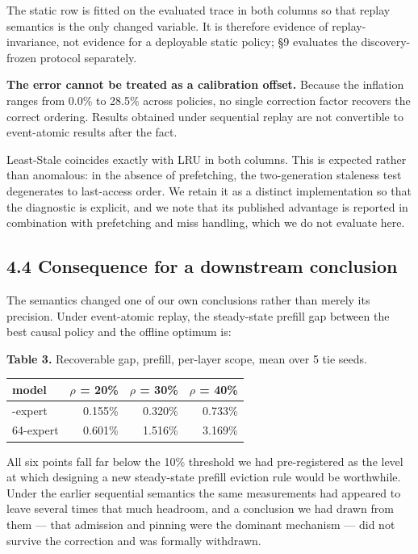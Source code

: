 \documentclass[
  10pt,
  letterpaper,
  10pt]{article}
\newcounter{none} %
\begin{document}
The static row is fitted on the evaluated trace in both columns so that
replay semantics is the only changed variable. It is therefore evidence
of replay-invariance, not evidence for a deployable static policy; §9
evaluates the discovery-frozen protocol separately.

\textbf{The error cannot be treated as a calibration offset.} Because
the inflation ranges from 0.0\% to 28.5\% across policies, no single
correction factor recovers the correct ordering. Results obtained under
sequential replay are not convertible to event-atomic results after the
fact.

Least-Stale coincides exactly with LRU in both columns. This is expected
rather than anomalous: in the absence of prefetching, the two-generation
staleness test degenerates to last-access order. We retain it as a
distinct implementation so that the diagnostic is explicit, and we note
that its published advantage is reported in combination with prefetching
and miss handling, which we do not evaluate here.

\subsection{4.4 Consequence for a downstream
conclusion}\label{consequence-for-a-downstream-conclusion}

The semantics changed one of our own conclusions rather than merely its
precision. Under event-atomic replay, the steady-state prefill gap
between the best causal policy and the offline optimum is:

\textbf{Table 3.} Recoverable gap, prefill, per-layer scope, mean over 5
tie seeds.

{\def\LTcaptype{none} %
\begin{longtable}[]{@{}lrrr@{}}
\toprule\noalign{}
model & \(\rho\) = 20\% & \(\rho\) = 30\% & \(\rho\) = 40\% \\
\midrule\noalign{}
\endhead
\bottomrule\noalign{}
\endlastfoot
40-expert & 0.155\% & 0.320\% & 0.733\% \\
64-expert & 0.601\% & 1.516\% & 3.169\% \\
\end{longtable}
}

All six points fall far below the 10\% threshold we had pre-registered
as the level at which designing a new steady-state prefill eviction rule
would be worthwhile. Under the earlier sequential semantics the same
measurements had appeared to leave several times that much headroom, and
a conclusion we had drawn from them --- that admission and pinning were
the dominant mechanism --- did not survive the correction and was
formally withdrawn.
\end{document}
